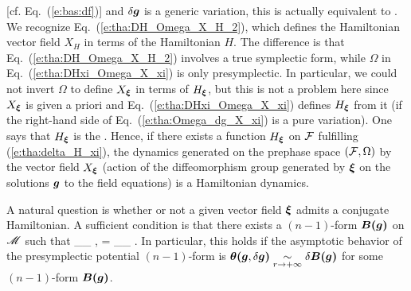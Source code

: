 [cf. Eq.~(\ref{e:bas:df})] and $\delta\bm{g}$ is a generic variation, this is
actually equivalent to
\be \label{e:tha:DHxi_Omega_X_xi}
     .
\ee
We recognize Eq.~(\ref{e:tha:DH_Omega_X_H_2}), which defines the Hamiltonian
vector field $X_H$ in terms of the Hamiltonian $H$. The difference is
that Eq.~(\ref{e:tha:DH_Omega_X_H_2}) involves a true symplectic form,
while $\Omega$ in Eq.~(\ref{e:tha:DHxi_Omega_X_xi}) is
only presymplectic. In particular,
we could not invert $\Omega$ to define $X_{\bm{\xi}}$ in terms of $H_{\bm{\xi}}$,
but this is not a problem here since $X_{\bm{\xi}}$ is given a priori and Eq.~(\ref{e:tha:DHxi_Omega_X_xi}) defines $H_{\bm{\xi}}$ from it (if the
right-hand side of Eq.~(\ref{e:tha:Omega_dg_X_xi}) is a
pure variation).
One says that $H_{\bm{\xi}}$ is the
\cite{WaldZ00}. Hence, if there exists a function $H_{\bm{\xi}}$ on $\mathcal{F}$
fulfilling (\ref{e:tha:delta_H_xi}),
the dynamics generated on the prephase space $(\mathcal{F},\Omega)$ by the vector field
$X_{\bm{\xi}}$ (action of the diffeomorphism group generated by $\bm{\xi}$ on the solutions
$\bm{g}$ to the field equations) is a Hamiltonian dynamics.

A natural question is whether or not a given vector field
$\bm{\xi}$ admits a conjugate Hamiltonian. A sufficient condition
is that there exists a $(n-1)$-form $\bm{B}\textbf{(}\bm{g}\textbf{)}$ on $\mathscr{M}$
such that
\be \label{e:tha:int_xi_theta_B}
     \int_{\Sp_\infty} \!\! \w{\xi}\cdot\w{\theta}\lld{},\delta{}\rld
     = \delta \int_{\Sp_\infty} \!\! \w{\xi}\cdot{}\lld{}\rld .
\ee
In particular, this holds if the
asymptotic behavior of
the presymplectic potential $(n-1)$-form is
$\bm{\theta}\textbf{(}\bm{g},\delta\bm{g}\textbf{)}
    \underset{r\to +\infty}{\sim} \delta \bm{B}\textbf{(}\bm{g}\textbf{)}$
for some $(n-1)$-form $\bm{B}\textbf{(}\bm{g}\textbf{)}$.

